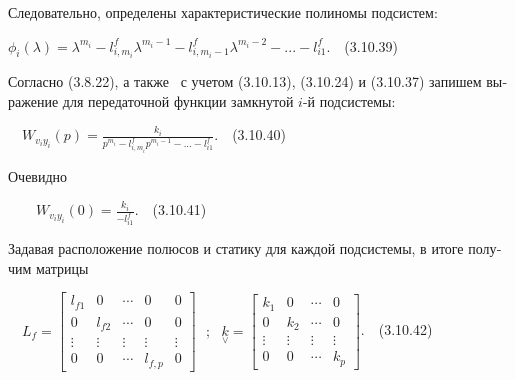 \documentclass[a4paper]{article}
\begin{document}
{\begin{russian}\sffamily
Следовательно, определены характеристические полиномы подсистем:
\end{russian}}

{\begin{russian}\sffamily
 $ϕ_i(λ)=λ^{m_i}-l_{i,m_i}^fλ^{m_i-1}-l_{i,m_i-1}^fλ^{m_i-2}-...-l_{\mathit{i1}}^f$.\ \ (3.10.39)
\end{russian}}

{\begin{russian}\sffamily
Согласно (3.8.22), а также \ с учетом (3.10.13), (3.10.24) и (3.10.37) запишем выражение для передаточной функции
замкнутой  $i$-й подсистемы:
\end{russian}}

{\begin{russian}\sffamily
\ \  $W_{v_iy_i}(p)=\frac{k_i}{p^{m_i}-l_{i,m_i}^fp^{m_i-1}-...-l_{\mathit{i1}}^f}$.\ \ (3.10.40)
\end{russian}}

{\begin{russian}\sffamily
Очевидно 
\end{russian}}

{\begin{russian}\sffamily
\ \ \ \  $W_{v_iy_i}(0)=\frac{k_i}{-l_{\mathit{i1}}^f}$.\ \ (3.10.41)
\end{russian}}

{\begin{russian}\sffamily
Задавая расположение полюсов и статику для каждой подсистемы, в итоге получим матрицы
\end{russian}}

{\begin{russian}\sffamily
\ \  $L_f=\left[\begin{matrix}l_{\mathit{f1}}&0&\cdots &0&0\\0&l_{\mathit{f2}}&\cdots &0&0\\\vdots &\vdots &\vdots
&\vdots &\vdots \\0&0&\cdots &l_{f,p}&0\end{matrix}\right]\text{  };\text{  }\underset{\vee
}{k}=\left[\begin{matrix}k_1&0&\cdots &0\\0&k_2&\cdots &0\\\vdots &\vdots &\vdots &\vdots \\0&0&\cdots
&k_p\end{matrix}\right]$.\ \ (3.10.42)
\end{russian}}
\end{document}
